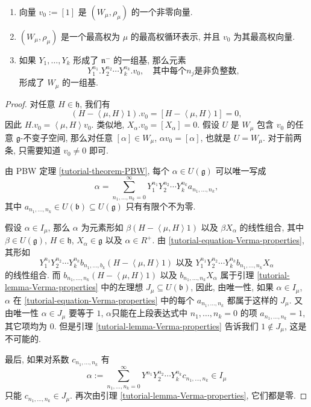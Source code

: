 \begin{theorem}
  \label{tutorial-theorem-Verma-properties}
  \begin{enumerate}
    \item 向量 \( v_0 := [1] \) 是 \( (W_{\mu}, \rho_{\mu}) \) 的一个非零向量.
    \item \( (W_{\mu}, \rho_{\mu}) \) 是一个最高权为 \( \mu \) 的最高权循环表示, 并且 \( v_0 \)
      为其最高权向量.
    \item 如果 \( Y_1,\ldots,Y_k \) 形成了 \( \mathfrak{n}^- \) 的一组基, 那么元素
      \[
        Y_1^{n_1}.Y_2^{n_2}\cdots Y_k^{n_k}.v_0,\quad \text{其中每个} n_j
        \text{是非负整数},
      \]
      形成了 \( W_{\mu} \) 的一组基.
  \end{enumerate}
\end{theorem}
\begin{proof}
  对任意 \( H \in \mathfrak{h} \), 我们有
  \[
    (H - \left\langle \mu, H \right\rangle 1).v_0 = [H - \left\langle
    \mu, H\right\rangle 1] = 0,
  \]
  因此 \( H.v_0 = \left\langle \mu, H \right\rangle v_0 \). 类似地, \(
  X_\alpha.v_0 = [X_\alpha] = 0 \). 假设 \( U \) 是 \( W_{\mu} \) 包含 \( v_0 \)
  的任意 \( \mathfrak{g} \)-不变子空间, 那么对任意 \( [\alpha] \in W_{\mu} \),
  \( \alpha v_0 = [\alpha] \), 也就是 \( U = W_{\mu} \). 对于前两条, 只需要知道
  \( v_0 \neq 0 \) 即可.

  由 PBW 定理 \ref{tutorial-theorem-PBW}, 每个 \( \alpha \in U(\mathfrak{g}) \)
  可以唯一写成
  \begin{equation}
    \alpha = \sum_{n_1,\ldots,n_k = 0}^{\infty} Y^{n_1}_1 Y^{n_2}_2 \cdots
    Y^{n_k}_k a_{n_1,\ldots, n_k}, \label{tutorial-equation-Verma-properties}
  \end{equation}
  其中 \( a_{n_1,\ldots,n_k} \in U(\mathfrak{b}) \subseteq U(\mathfrak{g}) \)
  只有有限个不为零.

  假设 \( \alpha \in I_{\mu} \), 那么 \( \alpha \) 为元素形如 \( \beta(H -
  \left\langle \mu, H \right\rangle 1) \) 以及 \( \beta X_\alpha \) 的线性组合,
  其中 \( \beta \in U(\mathfrak{g}) \), \( H \in \mathfrak{h} \), \( X_\alpha
  \in \mathfrak{g} \) 以及 \( \alpha \in R^+ \). 由
  \eqref{tutorial-equation-Verma-properties}, 其形如
  \[
    Y^{n_1}_1 Y^{n_2}_2 \cdots Y^{n_k}_k b_{n_1,\ldots, b_k}(H - \left\langle
    \mu, H \right\rangle 1) \text{ 以及 } Y^{n_1}_1 Y^{n_2}_2 \cdots Y^{n_k}_k
    b_{n_1, \ldots, n_k} X_\alpha
  \]
  的线性组合. 而 \( b_{n_1,\ldots, n_k}(H - \left\langle \mu, H \right\rangle 1)
  \) 以及 \( b_{n_1,\ldots, n_k}X_\alpha \) 属于引理
  \ref{tutorial-lemma-Verma-properties} 中的左理想 \( J_{\mu} \subseteq
  U(\mathfrak{b}) \), 因此, 由唯一性, 如果 \( \alpha \in I_{\mu} \), \( \alpha
  \) 在 \eqref{tutorial-equation-Verma-properties} 中的每个 \(
  a_{n_1,\ldots,n_k} \) 都属于这样的 \( J_{\mu} \). 又由唯一性 \( \alpha \in
  J_{\mu} \) 要等于 \( 1 \), \( \alpha \)只能在上段表达式中 \( n_1,\ldots, n_k =
  0 \) 的项 \( a_{n_1,\ldots, n_k} = 1 \), 其它项均为 \( 0 \). 但是引理
  \ref{tutorial-lemma-Verma-properties} 告诉我们 \( 1 \notin J_{\mu} \),
  这是不可能的.

  最后, 如果对系数 \( c_{n_1,\ldots,n_k} \) 有
  \[
    \alpha:= \sum_{n_1,\ldots,n_k = 0}^{\infty} Y^{n_1}Y^{n_2}_2\cdots Y^{n_k}_k
    c_{n_1,\ldots,n_k} \in I_{\mu}
  \]
  只能 \( c_{n_1,\ldots,n_k} \in J_{\mu} \). 再次由引理
  \ref{tutorial-lemma-Verma-properties}, 它们都是零.

\end{proof}
